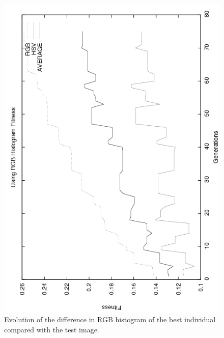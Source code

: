 {\begin{figure}
   \includegraphics[angle=-90,scale =0.40] {gfx/art/rgbgens.png}
\caption{Evolution of the difference in RGB histogram of the best individual compared with the test image. }
\label{fig:rgbgens}
\end{figure}

}
